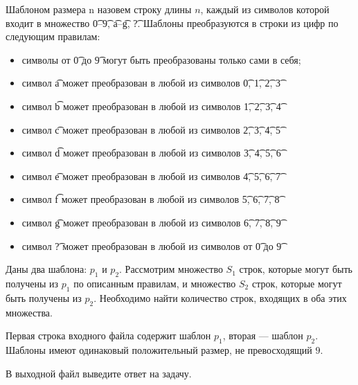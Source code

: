 Шаблоном размера n назовем строку длины $n$, каждый из символов которой входит в множество \t{0}--\t{9}, \t{a}--\t{g}, \t{?}. Шаблоны преобразуются в строки из цифр по следующим правилам:
\begin{itemize}
\item символы от \t{0} до \t{9} могут быть преобразованы только сами в себя; 
\item символ \t{a} может преобразован в любой из символов \t{0}, \t{1}, \t{2}, \t{3} 
\item символ \t{b} может преобразован в любой из символов \t{1}, \t{2}, \t{3}, \t{4} 
\item символ \t{c} может преобразован в любой из символов \t{2}, \t{3}, \t{4}, \t{5} 
\item символ \t{d} может преобразован в любой из символов \t{3}, \t{4}, \t{5}, \t{6} 
\item символ \t{e} может преобразован в любой из символов \t{4}, \t{5}, \t{6}, \t{7} 
\item символ \t{f} может преобразован в любой из символов \t{5}, \t{6}, \t{7}, \t{8} 
\item символ \t{g} может преобразован в любой из символов \t{6}, \t{7}, \t{8}, \t{9}
\item символ \t{?} может преобразован в любой из символов от \t{0} до \t{9} 
\end{itemize}
Даны два шаблона: $p_1$ и $p_2$. Рассмотрим множество $S_1$ строк, которые могут быть получены из $p_1$ по описанным правилам, и множество $S_2$ строк, которые могут быть получены из $p_2$. Необходимо найти количество строк, входящих в оба этих множества. 

\InputFile

Первая строка входного файла содержит шаблон $p_1$, вторая --- шаблон $p_2$. Шаблоны имеют одинаковый положительный размер, не превосходящий $9$. 

\OutputFile

В выходной файл выведите ответ на задачу. 

\SAMPLES
